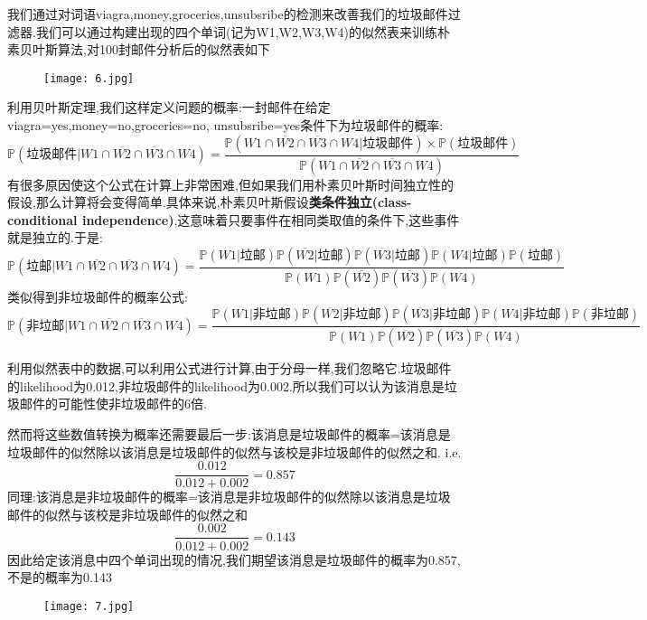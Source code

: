 \documentclass[11pt,a4paper,oneside]{book}
\begin{document}
我们通过对词语viagra,money,groceries,unsubsribe的检测来改善我们的垃圾邮件过滤器.我们可以通过构建出现的四个单词(记为W1,W2,W3,W4)的似然表来训练朴素贝叶斯算法,对100封邮件分析后的似然表如下
\begin{figure}[H]
	\centering
	\texttt{[image: 6.jpg]}  
\end{figure}
利用贝叶斯定理,我们这样定义问题的概率:一封邮件在给定viagra=yes,money=no,groceries=no, unsubsribe=yes条件下为垃圾邮件的概率:
\begin{equation}
\mathbb{P}(\mbox{垃圾邮件}|W1\cap\overline{W2}\cap\overline{W3}\cap W4)=\frac{\mathbb{P}(W1\cap\overline{W2}\cap\overline{W3}\cap W4|\mbox{垃圾邮件})\times\mathbb{P}(\mbox{垃圾邮件})}{\mathbb{P}(W1\cap\overline{W2}\cap\overline{W3}\cap W4)}
\end{equation}
有很多原因使这个公式在计算上非常困难,但如果我们用朴素贝叶斯时间独立性的假设,那么计算将会变得简单.具体来说,朴素贝叶斯假设\textbf{类条件独立(class-conditional independence)},这意味着只要事件在相同类取值的条件下,这些事件就是独立的.于是:
\begin{equation}
\mathbb{P}(\mbox{垃邮}|W1\cap\overline{W2}\cap\overline{W3}\cap W4)=
\frac{\mathbb{P}(W1|\mbox{垃邮})
	\mathbb{P}(\overline{W2}|\mbox{垃邮})
	\mathbb{P}(\overline{W3}|\mbox{垃邮})
	\mathbb{P}(W4|\mbox{垃邮})
	\mathbb{P}(\mbox{垃邮})}
{\mathbb{P}(W1)\mathbb{P}(\overline{W2})\mathbb{P}(\overline{W3})\mathbb{P}(W4)}
\end{equation}
类似得到非垃圾邮件的概率公式:
\begin{equation}
	\mathbb{P}(\mbox{非垃邮}|W1\cap\overline{W2}\cap\overline{W3}\cap W4)=
	\frac{\mathbb{P}(W1|\mbox{非垃邮})
		\mathbb{P}(\overline{W2}|\mbox{非垃邮})
		\mathbb{P}(\overline{W3}|\mbox{非垃邮})
		\mathbb{P}(W4|\mbox{非垃邮})
		\mathbb{P}(\mbox{非垃邮})}
	{\mathbb{P}(W1)\mathbb{P}(\overline{W2})\mathbb{P}(\overline{W3})\mathbb{P}(W4)}
\end{equation}

利用似然表中的数据,可以利用公式进行计算,由于分母一样,我们忽略它.垃圾邮件的likelihood为0.012,非垃圾邮件的likelihood为0.002.所以我们可以认为该消息是垃圾邮件的可能性使非垃圾邮件的6倍.

然而将这些数值转换为概率还需要最后一步:该消息是垃圾邮件的概率=该消息是垃圾邮件的似然除以该消息是垃圾邮件的似然与该校是非垃圾邮件的似然之和. i.e.
\begin{equation}
\frac{0.012}{0.012+0.002}=0.857
\end{equation}
同理:该消息是非垃圾邮件的概率=该消息是非垃圾邮件的似然除以该消息是垃圾邮件的似然与该校是非垃圾邮件的似然之和
\begin{equation}
\frac{0.002}{0.012+0.002}=0.143
\end{equation}
因此给定该消息中四个单词出现的情况,我们期望该消息是垃圾邮件的概率为0.857,不是的概率为0.143
\begin{figure}[H]
	\centering
	\texttt{[image: 7.jpg]}
\end{figure}
\end{document}
